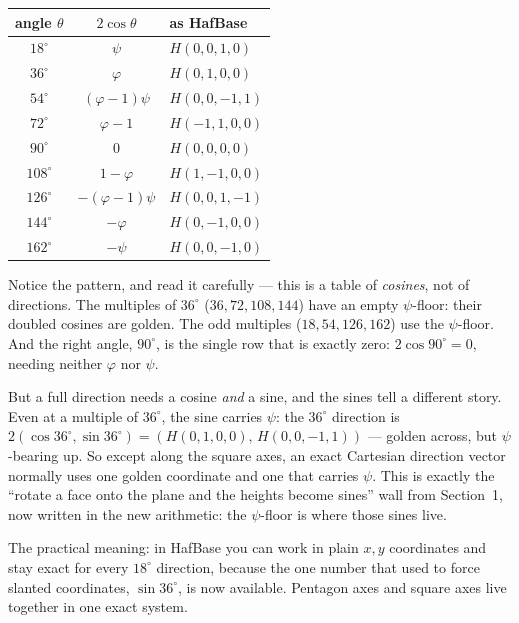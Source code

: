\documentclass[11pt]{article}
\newcommand{\phigr}{\varphi}
\newcommand{\Hn}[4]{H(#1,#2,#3,#4)}
\begin{document}
\begin{center}
\begin{tabular}{c c l}
\toprule
angle $\theta$ & $2\cos\theta$ & as HafBase \\
\midrule
$18^\circ$  & $\psi$            & $\Hn{0}{0}{1}{0}$ \\
$36^\circ$  & $\phigr$          & $\Hn{0}{1}{0}{0}$ \\
$54^\circ$  & $(\phigr-1)\psi$  & $\Hn{0}{0}{-1}{1}$ \\
$72^\circ$  & $\phigr - 1$      & $\Hn{-1}{1}{0}{0}$ \\
$90^\circ$  & $0$               & $\Hn{0}{0}{0}{0}$ \\
$108^\circ$ & $1 - \phigr$      & $\Hn{1}{-1}{0}{0}$ \\
$126^\circ$ & $-(\phigr-1)\psi$ & $\Hn{0}{0}{1}{-1}$ \\
$144^\circ$ & $-\phigr$         & $\Hn{0}{-1}{0}{0}$ \\
$162^\circ$ & $-\psi$           & $\Hn{0}{0}{-1}{0}$ \\
\bottomrule
\end{tabular}
\end{center}

Notice the pattern, and read it carefully --- this is a table of \emph{cosines}, not of directions.
The multiples of $36^\circ$ ($36, 72, 108, 144$) have an empty $\psi$-floor: their doubled cosines are
golden. The odd multiples ($18, 54, 126, 162$) use the $\psi$-floor. And the right angle, $90^\circ$,
is the single row that is exactly zero: $2\cos 90^\circ = 0$, needing neither $\phigr$ nor $\psi$.

But a full direction needs a cosine \emph{and} a sine, and the sines tell a different story. Even at a
multiple of $36^\circ$, the sine carries $\psi$: the $36^\circ$ direction is
$2(\cos 36^\circ, \sin 36^\circ) = (\Hn{0}{1}{0}{0},\, \Hn{0}{0}{-1}{1})$ --- golden across, but
$\psi$-bearing up. So except along the square axes, an exact Cartesian direction vector normally uses one
golden coordinate and one that carries $\psi$. This is exactly the ``rotate a face onto the plane and the
heights become sines'' wall from Section~1, now written in the new arithmetic: the $\psi$-floor is where
those sines live.

The practical meaning: in HafBase you can work in plain $x,y$ coordinates and stay exact for every
$18^\circ$ direction, because the one number that used to force slanted coordinates, $\sin 36^\circ$,
is now available. Pentagon axes and square axes live together in one exact system.
\end{document}
